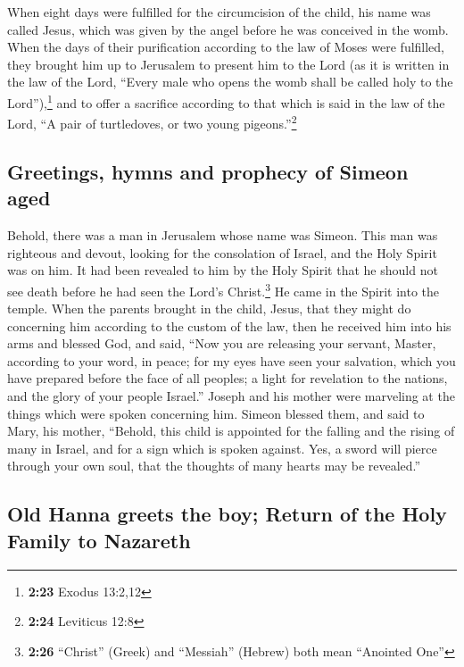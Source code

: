 When eight days were fulfilled for the circumcision of
the child, his name was called Jesus, which was given by the angel
before he was conceived in the womb.  When the days of
their purification according to the law of Moses were fulfilled, they
brought him up to Jerusalem to present him to the Lord 
(as it is written in the law of the Lord, ``Every male who opens the
womb shall be called holy to the Lord''),\footnote{\textbf{2:23} Exodus
  13:2,12}  and to offer a sacrifice according to that
which is said in the law of the Lord, ``A pair of turtledoves, or two
young pigeons.''\footnote{\textbf{2:24} Leviticus 12:8}

\hypertarget{greetings-hymns-and-prophecy-of-simeon-aged}{%
\subsection{Greetings, hymns and prophecy of Simeon
aged}\label{greetings-hymns-and-prophecy-of-simeon-aged}}

 Behold, there was a man in Jerusalem whose name was
Simeon. This man was righteous and devout, looking for the consolation
of Israel, and the Holy Spirit was on him.  It had been
revealed to him by the Holy Spirit that he should not see death before
he had seen the Lord's Christ.\footnote{\textbf{2:26} ``Christ'' (Greek)
  and ``Messiah'' (Hebrew) both mean ``Anointed One''} 
He came in the Spirit into the temple. When the parents brought in the
child, Jesus, that they might do concerning him according to the custom
of the law,  then he received him into his arms and
blessed God, and said,  ``Now you are releasing your
servant, Master, according to your word, in peace;  for
my eyes have seen your salvation,  which you have
prepared before the face of all peoples;  a light for
revelation to the nations, and the glory of your people Israel.''
 Joseph and his mother were marveling at the things which
were spoken concerning him.  Simeon blessed them, and
said to Mary, his mother, ``Behold, this child is appointed for the
falling and the rising of many in Israel, and for a sign which is spoken
against.  Yes, a sword will pierce through your own soul,
that the thoughts of many hearts may be revealed.''

\hypertarget{old-hanna-greets-the-boy-return-of-the-holy-family-to-nazareth}{%
\subsection{Old Hanna greets the boy; Return of the Holy Family to
Nazareth}\label{old-hanna-greets-the-boy-return-of-the-holy-family-to-nazareth}}

